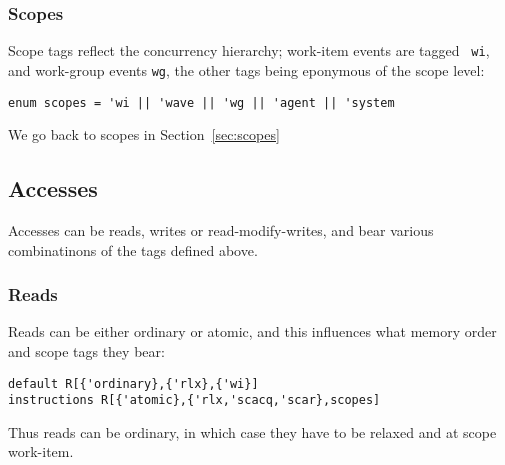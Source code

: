 
\subsubsection{Scopes}

Scope tags reflect the concurrency hierarchy; work-item events are tagged {\tt
wi}, and work-group events {\tt wg}, the other tags being eponymous of the
scope level: 
\begin{verbatim}
enum scopes = 'wi || 'wave || 'wg || 'agent || 'system
\end{verbatim}

We go back to scopes in Section~\ref{sec:scopes}

\subsection{Accesses}

Accesses can be reads, writes or read-modify-writes, and bear various
combinatinons of the tags defined above.

\subsubsection{Reads}

Reads can be either ordinary or atomic, and this influences what memory order
and scope tags they bear:
\begin{verbatim}
default R[{'ordinary},{'rlx},{'wi}]
instructions R[{'atomic},{'rlx,'scacq,'scar},scopes]
\end{verbatim}

Thus reads can be ordinary, in which case they have to be relaxed and at scope
work-item. %

